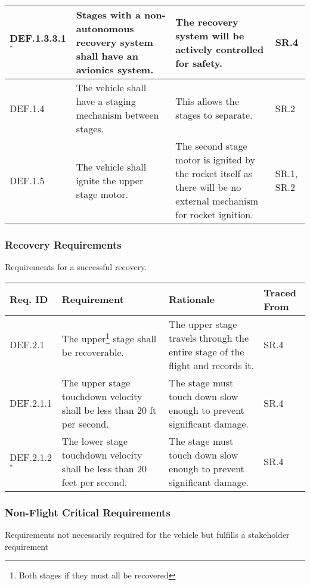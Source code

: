 \begin{table}[htbp]
\begin{tabulary}{\textwidth}{@{}LLLL@{}}
        DEF.1.3.3.1\(^*\) & Stages with a non-autonomous recovery system shall have an avionics system. & The recovery system will be actively controlled for safety. & SR.4 \\
    \midrule
        DEF.1.4 & The vehicle shall have a staging mechanism between stages. & This allows the stages to separate. & SR.2 \\
    \midrule
        DEF.1.5 & The vehicle shall ignite the upper stage motor. & The second stage motor is ignited by the rocket itself as there will be no external mechanism for rocket ignition. & SR.1, SR.2 \\
    \bottomrule
    \end{tabulary}

    \label{table:req-func-1}
\end{table}


\subsubsection{Recovery Requirements}
Requirements for a successful recovery.

\begin{table}[htbp] %
    \centering
    \footnotesize 
    \setlength{\tymin}{40pt}
    \let\raggedright\RaggedRight
    
    \begin{tabulary}{\textwidth}{@{}LLLL@{}}
    \toprule
        \textbf{Req. ID} & \textbf{Requirement} & \textbf{Rationale} & \textbf{Traced From} \\
    \midrule
        DEF.2.1 & The upper\footnote{Both stages if they must all be recovered} stage shall be recoverable. & The upper stage travels through the entire stage of the flight and records it. & SR.4 \\
        DEF.2.1.1 & The upper stage touchdown velocity shall be less than 20 ft per second. & The stage must touch down slow enough to prevent significant damage. & SR.4 \\ 
        DEF.2.1.2\(^*\) & The lower stage touchdown velocity shall be less than 20 feet per second. & The stage must touch down slow enough to prevent significant damage. & SR.4 \\
    \bottomrule
    \end{tabulary}

    \label{table:req-func-2}
\end{table}


\subsubsection{Non-Flight Critical Requirements}
Requirements not necessarily required for the vehicle but fulfills a stakeholder requirement	

